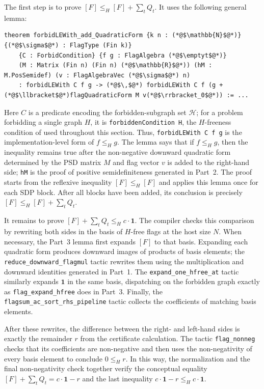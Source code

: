 \documentclass{article}
\newcommand{\lean}[1]{\texttt{#1}}
\newcommand{\emptyt}{\emptyset_{\mathrm{t}}}
\begin{document}
The first step is to prove
$[F]\leq_H[F]+\sum_tQ_t$.  It uses the following general lemma:
\begin{lstlisting}
theorem forbidLEWith_add_QuadraticForm {k n : (*@$\mathbb{N}$@*)} {(*@$\sigma$@*) : FlagType (Fin k)}
    {C : ForbidCondition} {f g : FlagAlgebra (*@$\emptyt$@*)}
    (M : Matrix (Fin n) (Fin n) (*@$\mathbb{R}$@*)) (hM : M.PosSemidef) (v : FlagAlgebraVec (*@$\sigma$@*) n)
    : forbidLEWith C f g -> (*@$\,$@*) forbidLEWith C f (g + (*@$\llbracket$@*)flagQuadraticForm M v(*@$\rrbracket_0$@*)) := ...
\end{lstlisting}
Here $C$ is a predicate encoding the forbidden-subgraph set $\mathcal{H}$; for a problem
forbidding a single graph $H$, it is \lean{forbiddenCondition H}, the
$H$-freeness condition of  used throughout
this section.  Thus,
\lean{forbidLEWith C f g} is the implementation-level form of $f\leq_H g$.
The lemma says that if $f\leq_H g$, then the inequality remains true after the
non-negative downward quadratic form determined by the PSD matrix $M$ and flag
vector $v$ is added to the right-hand side; \lean{hM} is the proof of positive
semidefiniteness generated in Part~2.
The proof starts from the reflexive inequality $[F]\leq_H[F]$ and applies this
lemma once for each SDP block.  After all blocks have been added, its conclusion is precisely
$[F]\leq_H[F]+\sum_tQ_t$.

It remains to prove $[F]+\sum_tQ_t\leq_H c\cdot\mathbf{1}$.  The compiler checks
this comparison by rewriting both sides in the basis of $H$-free flags at the
host size $N$.  When necessary, the Part~3 lemma first expands $[F]$ to that
basis.
Expanding each quadratic form produces downward images of products of basis
elements; the \lean{reduce\_downward\_flagmul} tactic rewrites them using the multiplication
and downward identities generated in Part~1.  The
\lean{expand\_one\_hfree\_at} tactic similarly expands $\mathbf{1}$ in the same
basis, dispatching on the forbidden graph exactly as
\lean{flag\_expand\_hfree} does in Part~3.  Finally,
the \lean{flagsum\_ac\_sort\_rhs\_pipeline} tactic collects the coefficients of matching
basis elements.

After these rewrites, the difference between the right- and left-hand sides is
exactly the remainder $r$ from the certificate calculation.  The tactic
\lean{flag\_nonneg} checks that its coefficients are non-negative and then uses
the non-negativity of every basis element to conclude $0\leq_H r$.  In this way,
the normalization and the final non-negativity check together verify the
conceptual equality $[F]+\sum_tQ_t=c\cdot\mathbf{1}-r$ and the last inequality
$c\cdot\mathbf{1}-r\leq_H c\cdot\mathbf{1}$.
\end{document}
